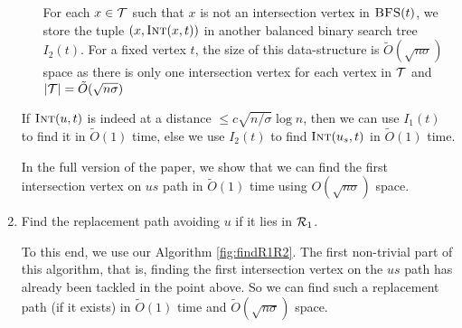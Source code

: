 \begin{enumerate}[leftmargin=*,noitemsep,nolistsep]
\begin{itemize}
  \begin{comment}
        \begin{figure}[hpt!]
        \begin{algorithm}[H]
        \If{$u \in I_1(t)$}
        {
            return $I_1(u,t)$;
        }
        \Else
        {
            $u_s \leftarrow B_1(s,u)$\;
            return $I_2(u_s,t)$;
        }
        \end{algorithm}
        \caption{\textsc{Find-Int}$(s,u,t)$: An algorithm to find $\INT_s(u,t)$}
        \end{figure}
  \end{comment}
  \noindent
  For each $x \in \mathcal{T}$
  such that $x$ is not an intersection vertex in $\textsc{BFS}(t)$, we store the tuple
  $(x,\textsc{Int}(x,t))$ in another balanced binary search tree $I_2(t)$. For a fixed vertex $t$, the
  size of this data-structure is $\tilde O(\sqrt{n\sigma})$ space
  as there is only one intersection vertex for each vertex
  in $\mathcal{T}$ and $|\mathcal{T}| = \tilde O(\sqrt{n \sigma})$

\end{itemize}
  \noindent If $\textsc{Int}(u,t)$ is indeed at a distance $\le
c \sqrt{n / \sigma} \log n$,
  then we can use $I_1(t)$  to find it in $\tilde O(1)$
time, else we use $I_2(t)$ to find
  $\textsc{Int}(u_s,t)$ in $\tilde O(1)$ time.\\

  \begin{comment}
  \noindent {\em Assuming $x = \INT_s(u,t)$,  find $\INT_s(x,t)$}

  Our aim is to find the segment which ends at $x$ in \SBFS($t)$. To this end,
  we find $\INT(x,t)$. To this end, we use another balanced binary search tree.
  For each intersection vertex $v \in $ \SBFS($t$), we store the tuple
  $(s,\INT_s(v,t))$ in $I_3(v,t)$. Unlike non intersection vertex, for an
  intersection vertex $v$, $\INT_s(v,t)$ may be dependent on $s$.

  \end{comment}
\else
\noindent In the full version of the paper, we show that we can find the first intersection vertex  on $us$ path
in $\tilde O(1)$ time using $O(\sqrt{n\sigma} )$ space.
\fi
\item Find  the replacement path avoiding $u$  if it lies in $\mathcal{R}_1$.
\label{fcase1}

\noindent To this end, we use our Algorithm \iflong\ref{fig:findR1R2}\fi.
The first non-trivial part of this algorithm, that is, finding the first
intersection vertex on the $us$ path has already been tackled in the point above.
So we can find such a replacement path (if it exists) in
$\tilde O(1)$ time  and $\tilde O(\sqrt{n \sigma})$ space.\iflong\\\else\vspace{1mm}\fi



\end{enumerate}
